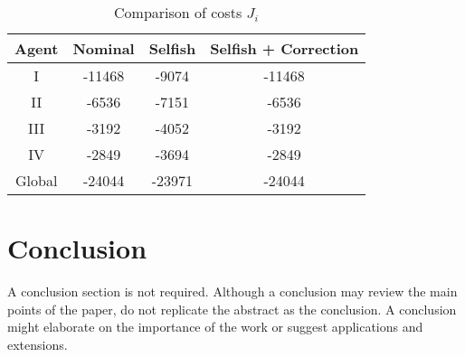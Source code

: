 \documentclass{ifacconf}  %
\begin{document}
\begin{table}[t]
  \centering
  \caption{Comparison of costs $J_{i}$}\label{tab:costsGlobalLocal}
  \begin{tabular}[t]{cccc} \toprule
    Agent  & Nominal & Selfish & Selfish + Correction\\
    \midrule
    I & -11468 &  -9074 & -11468 \\
    II & -6536 &  -7151 & -6536 \\
    III & -3192 &  -4052 & -3192 \\
    IV & -2849 &  -3694 & -2849 \\
    Global & -24044 &  -23971 & -24044 \\


    \bottomrule
  \end{tabular}
\end{table}

\section{Conclusion}

A conclusion section is not required. Although a conclusion may review
the main points of the paper, do not replicate the abstract as the
conclusion. A conclusion might elaborate on the importance of the work
or suggest applications and extensions.


\end{document}
